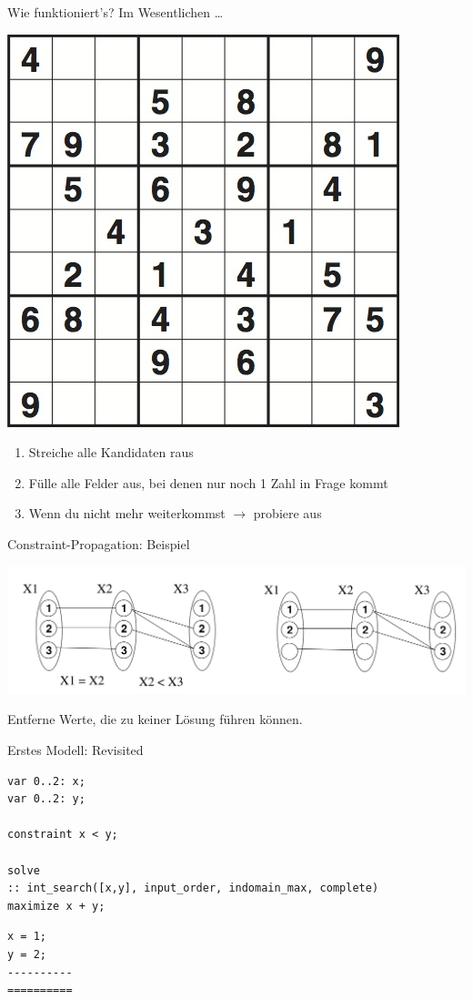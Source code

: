 \begin{frame}{Wie funktioniert's?}
Im Wesentlichen \ldots 
\begin{center}
\includegraphics[width=.4\textwidth]{img/sudoku.jpg}
\end{center}
\begin{enumerate}
\item Streiche alle Kandidaten raus 
\item Fülle alle Felder aus, bei denen nur noch 1 Zahl in Frage kommt
\item Wenn du nicht mehr weiterkommst $\rightarrow$ probiere aus 
\end{enumerate}
\end{frame}

\begin{frame}{Constraint-Propagation: Beispiel}
\begin{center}
\includegraphics[width=\textwidth]{img/constprop.png}
\end{center}
Entferne Werte, die zu keiner Lösung führen können. 
\end{frame}


\graphicspath{{img/}}


\begin{frame}[fragile]{Erstes Modell: Revisited}
\begin{lstlisting}
var 0..2: x;
var 0..2: y; 

constraint x < y;

solve
:: int_search([x,y], input_order, indomain_max, complete)
maximize x + y;\end{lstlisting}


\vspace*{2ex}

\small
\begin{verbatim}
x = 1;
y = 2;
----------
==========
\end{verbatim}

\end{frame}

